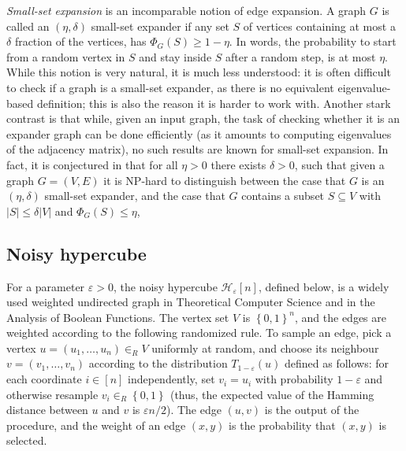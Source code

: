 \documentclass[11pt]{article}
\newcommand\card[1]{\left| {#1} \right|}
\newcommand\set[1]{{\left\{ #1 \right\}}}
\newcommand\power[1]{\set{0,1}^{#1}}
\newcommand\eps{\varepsilon}
\renewcommand\geq{\geqslant}
\renewcommand\leq{\leqslant}
\begin{document}
%

\emph{Small-set expansion} %
is an incomparable notion of edge expansion. A graph $G$ is called an $(\eta,\delta)$
small-set expander
if any set %
$S$ of vertices  %
containing at most
a  %
$\delta$ fraction of the vertices, has $\Phi_G(S)\geq 1-\eta$. In words, the
probability  %
%
%
to start from a random vertex in $S$ and stay inside $S$ after a random step, is at most $\eta$.
While this notion is very natural, it is much less understood:
it is often %
difficult  %
to check if a graph is a small-set expander, as there is no equivalent %
eigenvalue-based definition; %
%
%
%
%
%
%
%
%
%
%
%
%
%
%
%
%
this is also the reason it is harder to work with. %
Another stark contrast is that while, given an input graph, the task of
checking whether it is an expander graph
%
can be done efficiently (as it amounts to computing eigenvalues of the adjacency matrix),
no such results are known for small-set expansion.  %
%
%
In fact, it is conjectured in \cite{RagSteurer,RagSteurerTuls} that for all $\eta>0$ there
exists $\delta>0$, such that given a graph $G = (V,E)$
it is NP-hard to distinguish between the case that
$G$ is an $(\eta,\delta)$ small-set expander, and
the case that $G$ contains a subset $S\subseteq V$ with
$\card{S}\leq \delta \card{V}$ and $\Phi_G(S)\leq \eta$,
%
%
%
%
%
%
%

\subsection{Noisy hypercube}
For a parameter $\eps>0$, the noisy hypercube
$\mathcal{H}_\eps[n]$,   %
defined below, is a widely used weighted undirected graph in Theoretical Computer Science and
in the  %
Analysis of Boolean Functions.
%
%
%
%
%
%
The vertex set $V$ is $\power{n}$, and the edges are weighted according to the
following %
%
randomized rule.  %
To sample an edge, pick a vertex %
$u =(u_1,\dots,u_n)\in_R V$ %
uniformly at random, and choose its neighbour %
$v=(v_1,\dots,v_n)$  %
according to the distribution $T_{1-\eps}(u)$
defined as follows:  %
for each coordinate $i\in [n]$ independently,
set $v_i = u_i$ with probability $1-\eps$ and otherwise resample $v_i\in_R \power{}$
(thus, %
the expected value of the  %
Hamming distance between $u$ and $v$ is $\eps n/2$).
The edge $(u,v)$ is the output of the %
procedure,  %
and the weight of an edge $(x,y)$ is the probability %
%
that $(x,y)$ is selected.  %
\end{document}
